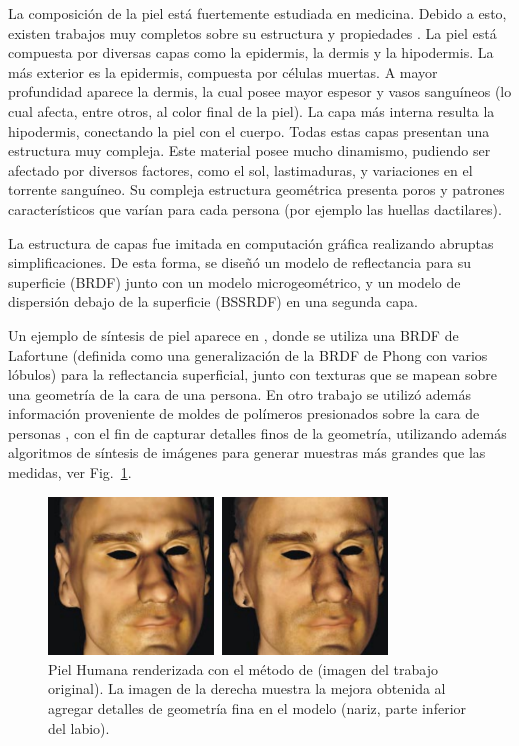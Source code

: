La composición de la piel está fuertemente estudiada en medicina.
Debido a esto, existen trabajos muy completos sobre su estructura y propiedades \cite{Walters2002}.
La piel está compuesta por diversas capas como la epidermis, la dermis y la hipodermis.
La más exterior es la epidermis, compuesta por células muertas.
A mayor profundidad aparece la dermis, la cual posee mayor espesor y vasos sanguíneos (lo cual afecta, entre otros, al color final de la piel).
La capa más interna resulta la hipodermis, conectando la piel con el cuerpo.
Todas estas capas presentan una estructura muy compleja.
Este material posee mucho dinamismo, pudiendo ser afectado por diversos factores, como el sol, lastimaduras, y variaciones en el torrente sanguíneo.
Su compleja estructura geométrica presenta poros y patrones característicos que varían para cada persona (por ejemplo las huellas dactilares).

La estructura de capas fue imitada en computación gráfica realizando abruptas simplificaciones.
De esta forma, se diseñó un modelo de reflectancia para su superficie (BRDF) junto con un modelo microgeométrico, y un modelo de dispersión debajo de la superficie (BSSRDF) en una segunda capa.

Un ejemplo de síntesis de piel aparece en \cite{Marschner2000}, donde se utiliza una BRDF de Lafortune (definida como una generalización de la BRDF de Phong con varios lóbulos) para la reflectancia superficial, junto con texturas que se mapean sobre una geometría de la cara de una persona.
En otro trabajo se utilizó además información proveniente de moldes de polímeros presionados sobre la cara de personas \cite{Haro2001}, con el fin de capturar detalles finos de la geometría, utilizando además algoritmos de síntesis de imágenes para generar muestras más grandes que las medidas, ver Fig.~\ref{fg:piel}.

\begin{figure}
\center
\includegraphics[width=9cm]{figures/piel}
\caption[Piel Humana renderizada]{Piel Humana renderizada con el método de \cite{Marschner2000} (imagen del trabajo original). La imagen de la derecha muestra la mejora obtenida al agregar detalles de geometría fina en el modelo (nariz, parte inferior del labio).}
\label{fg:piel}
\end{figure}


